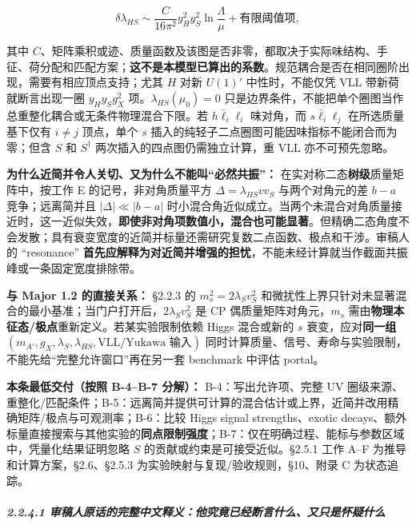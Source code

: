 \documentclass[
  chinese,
  UTF8]{ctexart}
\begin{document}
\[
\delta\lambda_{HS}\sim \frac{C}{16\pi^2}y_H^2y_S^2\ln\frac{\Lambda}{\mu}
+\text{有限阈值项},
\]

其中
\(C\)、矩阵乘积或迹、质量函数及该图是否非零，都取决于实际味结构、手征、荷分配和匹配方案；\textbf{这不是本模型已算出的系数}。规范耦合是否在相同圈阶出现，需要有相应顶点支持；尤其
\(H\) 对新 \(U(1)'\) 中性时，不能仅凭 VLL 带新荷就断言出现一圈
\(y_Hy_Sg_X^2\) 项。\(\lambda_{HS}(\mu_0)=0\)
只是边界条件，不能把单个圈图当作总重整化耦合或无条件物理混合下限。若
\(h\bar\ell_i\ell_i\) 味对角，而 \(s\bar\ell_i\ell_j\)
在所选质量基下仅有 \(i\ne j\) 顶点，单个 \(s\)
插入的纯轻子二点圈图可能因味指标不能闭合而为零；但含 \(S\) 和
\(S^\dagger\) 两次插入的四点图仍需独立计算，重 VLL 亦不可预先忽略。

\textbf{为什么近简并令人关切、又为什么不能叫``必然共振''：}
在实对称二态\textbf{树级}质量矩阵中，按工作 E 的记号，非对角质量平方
\(\Delta=\lambda_{HS}vv_S\) 与两个对角元的差 \(b-a\) 竞争；远离简并且
\(|\Delta|\ll|b-a|\)
时小混合角近似成立。当两个未混合对角质量接近时，这一近似失效，\textbf{即使非对角项数值小，混合也可能显著}。但精确二态角度不会发散；具有衰变宽度的近简并标量还需研究复数二点函数、极点和干涉。审稿人的
``resonance''
\textbf{首先应解释为对近简并增强的担忧}，不能未经计算就当作截面共振峰或一条固定宽度排除带。

\textbf{与 Major 1.2 的直接关系：} §2.2.3 的 \(m_s^2=2\lambda_Sv_S^2\)
和微扰性上界只针对未显著混合的最小基准；当门户打开后，\(2\lambda_Sv_S^2\)
是 CP 偶质量矩阵对角元，\(m_s\)
需由\textbf{物理本征态/极点}重新定义。若某实验限制依赖 Higgs 混合或新的
\(s\) 衰变，应对\textbf{同一组}
\((m_{A'},g_X,\lambda_S,\lambda_{HS},\text{VLL/Yukawa 输入})\)
同时计算质量、信号、寿命与实验限制，不能先给``完整允许窗口''再在另一套
benchmark 中评估 portal。

\textbf{本条最低交付（按照 B-4--B-7 分解）：} B-4：写出允许项、完整 UV
圈级来源、重整化/匹配条件；B-5：远离简并提供可计算的混合估计或上界，近简并改用精确矩阵/极点与可观测率；B-6：比较
Higgs signal strengths、exotic
decays、额外标量直接搜索与其他实验的\textbf{同点限制强度}；B-7：仅在明确过程、能标与参数区域中，凭量化结果证明忽略
\(S\) 的贡献或约束是可接受近似。§2.5.1 工作 A--F
为推导和计算方案，§2.6、§2.5.3 为实验映射与复现/验收规则，§10、附录 C
为状态追踪。

\subparagraph{2.2.4.1
审稿人原话的完整中文释义：他究竟已经断言什么、又只是怀疑什么}\label{ux5ba1ux7a3fux4ebaux539fux8bddux7684ux5b8cux6574ux4e2dux6587ux91caux4e49ux4ed6ux7a76ux7adfux5df2ux7ecfux65adux8a00ux4ec0ux4e48ux53c8ux53eaux662fux6000ux7591ux4ec0ux4e48}
\end{document}
